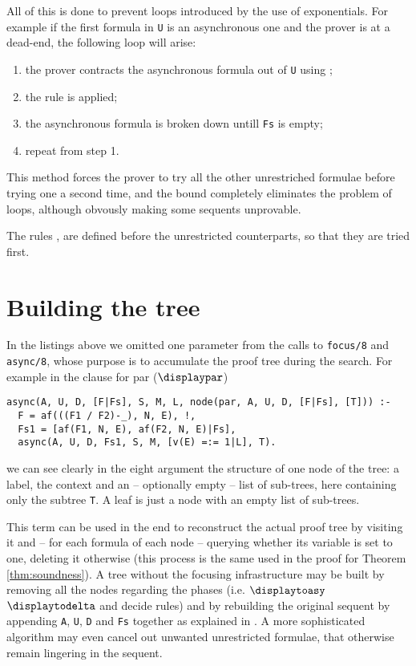All of this is done to prevent loops introduced by the use of exponentials.
For example if the first formula in \texttt{U} is an asynchronous one and the prover is at a dead-end, the following loop will arise:
\begin{enumerate}
	\item the prover contracts the asynchronous formula out of \texttt{U} using \derRule{\displaydecide[2]};
	\item the rule \derRule{\displaytoasy} is applied;
	\item the asynchronous formula is broken down untill \texttt{Fs} is empty;
	\item repeat from step 1.
\end{enumerate}
This method forces the prover to try all the other unrestriched formulae before trying one a second time, and the bound completely eliminates the problem of loops, although obvously making some sequents unprovable.

The rules \derRule{\displaydecide[1]}, \derRule{\displayid[1]} are defined before the unrestricted counterparts, so that they are tried first.

\section{Building the tree}
In the listings above we omitted one parameter from the calls to \texttt{focus/8} and \texttt{async/8}, whose purpose is to accumulate the proof tree during the search.
For example in the clause for par ($\displaypar$)
\begin{verbatim}
async(A, U, D, [F|Fs], S, M, L, node(par, A, U, D, [F|Fs], [T])) :- 
  F = af(((F1 / F2)-_), N, E), !,
  Fs1 = [af(F1, N, E), af(F2, N, E)|Fs],
  async(A, U, D, Fs1, S, M, [v(E) =:= 1|L], T).
\end{verbatim}
we can see clearly in the eight argument the structure of one node of the tree: a label, the context and an -- optionally empty -- list of sub-trees, here containing only the subtree \texttt{T}.
A leaf is just a node with an empty list of sub-trees.

This term can be used in the end to reconstruct the actual proof tree by visiting it and -- for each formula of each node -- querying whether its variable is set to one, deleting it otherwise (this process is the same used in the proof for Theorem \ref{thm:soundness}).
A tree without the focusing infrastructure may be built by removing all the nodes regarding the phases (i.e. $\displaytoasy$ $\displaytodelta$ and decide rules) and by rebuilding the original sequent by appending \texttt{A}, \texttt{U}, \texttt{D} and \texttt{Fs} together as explained in \cite{Focusing}. 
A more sophisticated algorithm may even cancel out unwanted unrestricted formulae, that otherwise remain lingering in the sequent.

